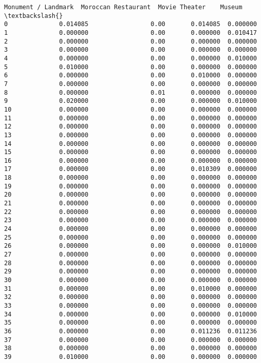\documentclass[11pt]{article}
\begin{document}
\begin{tcolorbox}[breakable, size=fbox, boxrule=.5pt, pad at break*=1mm, opacityfill=0]
\begin{Verbatim}[commandchars=\\\{\}]
    Monument / Landmark  Moroccan Restaurant  Movie Theater    Museum  \textbackslash{}
0              0.014085                 0.00       0.014085  0.000000
1              0.000000                 0.00       0.000000  0.010417
2              0.000000                 0.00       0.000000  0.000000
3              0.000000                 0.00       0.000000  0.000000
4              0.000000                 0.00       0.000000  0.010000
5              0.010000                 0.00       0.000000  0.000000
6              0.000000                 0.00       0.010000  0.000000
7              0.000000                 0.00       0.000000  0.000000
8              0.000000                 0.01       0.000000  0.000000
9              0.020000                 0.00       0.000000  0.010000
10             0.000000                 0.00       0.000000  0.000000
11             0.000000                 0.00       0.000000  0.000000
12             0.000000                 0.00       0.000000  0.000000
13             0.000000                 0.00       0.000000  0.000000
14             0.000000                 0.00       0.000000  0.000000
15             0.000000                 0.00       0.000000  0.000000
16             0.000000                 0.00       0.000000  0.000000
17             0.000000                 0.00       0.010309  0.000000
18             0.000000                 0.00       0.000000  0.000000
19             0.000000                 0.00       0.000000  0.000000
20             0.000000                 0.00       0.000000  0.000000
21             0.000000                 0.00       0.000000  0.000000
22             0.000000                 0.00       0.000000  0.000000
23             0.000000                 0.00       0.000000  0.000000
24             0.000000                 0.00       0.000000  0.000000
25             0.000000                 0.00       0.000000  0.000000
26             0.000000                 0.00       0.000000  0.010000
27             0.000000                 0.00       0.000000  0.000000
28             0.000000                 0.00       0.000000  0.000000
29             0.000000                 0.00       0.000000  0.000000
30             0.000000                 0.00       0.000000  0.000000
31             0.000000                 0.00       0.010000  0.000000
32             0.000000                 0.00       0.000000  0.000000
33             0.000000                 0.00       0.000000  0.000000
34             0.000000                 0.00       0.000000  0.010000
35             0.000000                 0.00       0.000000  0.000000
36             0.000000                 0.00       0.011236  0.011236
37             0.000000                 0.00       0.000000  0.000000
38             0.000000                 0.00       0.000000  0.000000
39             0.010000                 0.00       0.000000  0.000000


\end{Verbatim}
\end{tcolorbox}
\end{document}
